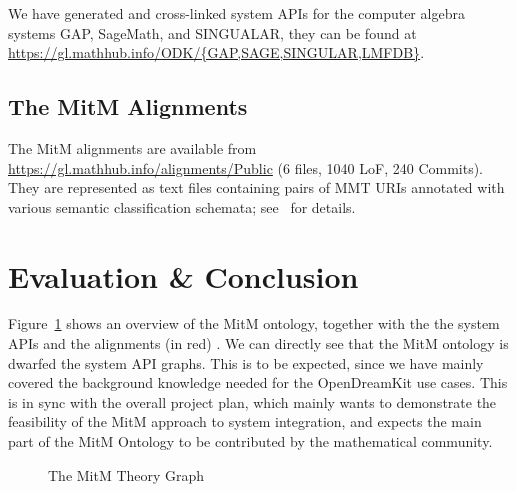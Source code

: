 \documentclass[book]{deliverablereport}
\begin{document}
We have generated and cross-linked system APIs for the computer algebra systems GAP,
SageMath, and SINGUALAR, they can be found at
\url{https://gl.mathhub.info/ODK/{GAP,SAGE,SINGULAR,LMFDB}}.

\subsection{The MitM Alignments}

The MitM alignments are available from \url{https://gl.mathhub.info/alignments/Public} (6
files, 1040 LoF, 240 Commits). They are represented as text files containing pairs of MMT
URIs annotated with various semantic classification schemata;
see~\cite{MueGauKal:cacfms17} for details.

\section{Evaluation \& Conclusion}\label{sec:concl}
Figure~\ref{fig:MitM-graph} shows an overview of the MitM ontology, together with the the
system APIs and the alignments (in red) . We can directly see
that the MitM ontology is dwarfed the system API graphs. This is to be expected, since we
have mainly covered the background knowledge needed for the OpenDreamKit use cases. This
is in sync with the overall project plan, which mainly wants to demonstrate the
feasibility of the MitM approach to system integration, and expects the main part of the
MitM Ontology to be contributed by the mathematical community.  

\begin{figure}\centering
  \caption{The MitM Theory Graph}\label{fig:MitM-graph}
\end{figure}
\printbibliography
\end{document}
